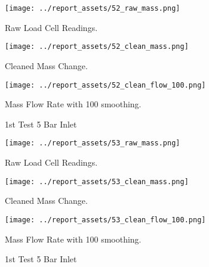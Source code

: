 \begin{figure}[htbp]
    \centering

    \begin{minipage}{0.3\textwidth}
        \centering
        \texttt{[image: ../report\_assets/52\_raw\_mass.png]}
        \caption*{Raw Load Cell Readings.}
    \end{minipage}
    \hfill
    \begin{minipage}{0.3\textwidth}
        \centering
        \texttt{[image: ../report\_assets/52\_clean\_mass.png]}
        \caption*{Cleaned Mass Change.}
    \end{minipage}
    \hfill
    \begin{minipage}{0.3\textwidth}
        \centering
        \texttt{[image: ../report\_assets/52\_clean\_flow\_100.png]}
        \caption*{Mass Flow Rate with 100 smoothing.}
    \end{minipage}
    \caption{1st Test 5 Bar Inlet}
    
\end{figure}\label{fig:52}

\newpage

\begin{figure}[htbp]
    \centering

    \begin{minipage}{0.3\textwidth}
        \centering
        \texttt{[image: ../report\_assets/53\_raw\_mass.png]}
        \caption*{Raw Load Cell Readings.}
    \end{minipage}
    \hfill
    \begin{minipage}{0.3\textwidth}
        \centering
        \texttt{[image: ../report\_assets/53\_clean\_mass.png]}
        \caption*{Cleaned Mass Change.}
    \end{minipage}
    \hfill
    \begin{minipage}{0.3\textwidth}
        \centering
        \texttt{[image: ../report\_assets/53\_clean\_flow\_100.png]}
        \caption*{Mass Flow Rate with 100 smoothing.}
    \end{minipage}
    \caption{1st Test 5 Bar Inlet}
    
\end{figure}\label{fig:53}

